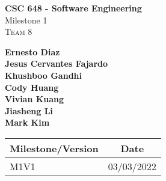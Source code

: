 \begin{titlepage}
\begin{center}
	\vspace*{1cm}
	\Huge
	\textbf{CSC 648 - Software Engineering}
	\LARGE\\
	Milestone 1\\
	\Large
	\textsc{Team 8}
	\begin{multicols}{2}
	\textbf{Ernesto Diaz\\Jesus Cervantes Fajardo\\Khushboo Gandhi\\Cody Huang\\Vivian Kuang\\Jiasheng Li\\Mark Kim}
	\end{multicols}
	\large
	\vspace{1cm}
	\begin{tabular}{ | l | c | }
		\hline
		\textbf{Milestone/Version} & \textbf{Date}\\
		\hline
		M1V1 & 03/03/2022\\
		\hline
	\end{tabular}

\end{center}
\end{titlepage}